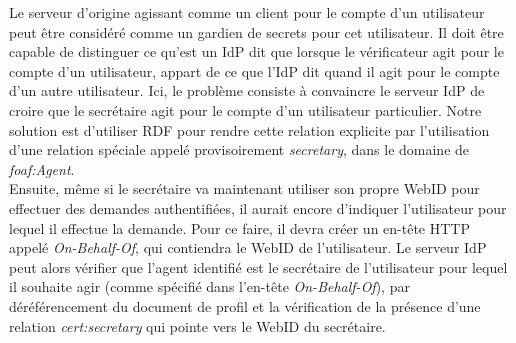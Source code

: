 Le serveur d'origine agissant comme un client pour le compte d'un utilisateur peut être considéré comme un gardien de secrets pour cet utilisateur. Il doit être capable de distinguer ce qu'est un IdP dit que lorsque le vérificateur agit pour le compte d'un utilisateur, appart de ce que l'IdP dit quand il agit pour le compte d'un autre utilisateur. Ici, le problème consiste à convaincre le serveur IdP de croire que le secrétaire agit pour le compte d'un utilisateur particulier. Notre solution est d'utiliser RDF pour rendre cette relation explicite par l'utilisation d'une relation spéciale appelé provisoirement \textit{secretary}, dans le domaine de \textit{foaf:Agent}.\\


Ensuite, même si le secrétaire va maintenant utiliser son propre WebID pour effectuer des demandes authentifiées, il aurait encore d'indiquer l'utilisateur pour lequel il effectue la demande. Pour ce faire, il devra créer un en-tête HTTP appelé \textit{On-Behalf-Of}, qui contiendra le WebID de l'utilisateur. Le serveur IdP peut alors vérifier que l'agent identifié est le secrétaire de l'utilisateur pour lequel il souhaite agir (comme spécifié dans l'en-tête \textit{On-Behalf-Of}), par déréférencement du document de profil et la vérification de la présence d'une relation \textit{cert:secretary} qui pointe vers le WebID du secrétaire.


